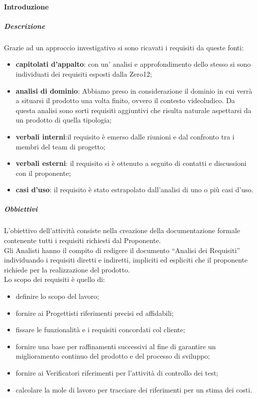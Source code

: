 			\paragraph{Introduzione}
				\subparagraph{Descrizione}
					Grazie ad un approccio investigativo si sono ricavati i requisiti da queste fonti:\\
					\begin{itemize}
						\item\textbf{capitolati d’appalto}: con un’ analisi e approfondimento dello stesso si sono individuati dei requisiti esposti dalla Zero12;
						\item\textbf{analisi di dominio}: Abbiamo preso in considerazione il dominio in cui verrà a situarsi il prodotto una volta finito, ovvero il contesto videoludico. Da questa analisi sono sorti requisiti aggiuntivi che risulta naturale aspettarsi da un prodotto di quella tipologia;
						\item\textbf{verbali interni}:il requisito è emerso dalle riunioni e dal confronto tra i membri del team di progetto;
						\item\textbf{verbali esterni}: il requisito si è ottenuto a seguito di contatti e discussioni con il proponente;
						\item\textbf{casi d’uso}: il requisito è stato estrapolato dall'analisi di uno o più casi d’uso.
					\end{itemize}
				\subparagraph{Obbiettivi}
					L’obiettivo dell'attività consiste nella creazione della documentazione formale contenente tutti i requisiti richiesti dal Proponente.\\
					Gli Analisti hanno il compito di redigere il documento “Analisi dei Requisiti” individuando i requisiti diretti e indiretti, impliciti ed espliciti che il proponente richiede per la realizzazione del prodotto.\\
					Lo scopo dei requisiti è quello di:\\
					\begin{itemize}
						\item definire lo scopo del lavoro;
						\item fornire ai Progettisti riferimenti precisi ed affidabili;
						\item fissare le funzionalità e i requisiti concordati col cliente;
						\item fornire una base per raffinamenti successivi al fine di garantire un miglioramento continuo del prodotto e del processo di sviluppo;
						\item fornire ai Verificatori riferimenti per l'attività di controllo dei test;
						\item calcolare la mole di lavoro per tracciare dei riferimenti per un stima dei costi.
					\end{itemize}
